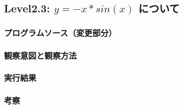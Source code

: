 \subsection{Level2.3: $y=-x*sin(x)$ について}
\subsubsection{プログラムソース（変更部分）}
\subsubsection{観察意図と観察方法}
\subsubsection{実行結果}
\subsubsection{考察}

